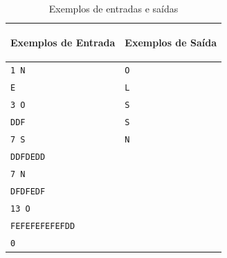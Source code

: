 \begin{table}[ht]
    \centering
    \begin{tabular}{|p{7cm}|p{7cm}|}
        \hline
        \begin{center}
            \vspace{-0.3cm}
            \textbf{Exemplos de Entrada}
            \vspace{-0.3cm}
        \end{center} 
         &  
        \begin{center}
            \vspace{-0.3cm}
            \textbf{Exemplos de Saída}
            \vspace{-0.3cm}
        \end{center} \\ \hline
         \texttt{1 N} & \texttt{O} \\  
         \texttt{E} & \texttt{L} \\
         \texttt{3 O} & \texttt{S} \\  
         \texttt{DDF} & \texttt{S} \\
         \texttt{7 S} & \texttt{N} \\  
         \texttt{DDFDEDD} & \texttt{} \\
         \texttt{7 N} & \texttt{} \\  
         \texttt{DFDFEDF} & \texttt{} \\
         \texttt{13 O} & \texttt{} \\  
         \texttt{FEFEFEFEFEFDD} & \texttt{} \\
         \texttt{0} &  \\ \hline
    \end{tabular}
    \caption{Exemplos de entradas e saídas}
    \label{tab:inputL}

    
\end{table}

\newpage

\begin{center}
\noindent

\end{center}

